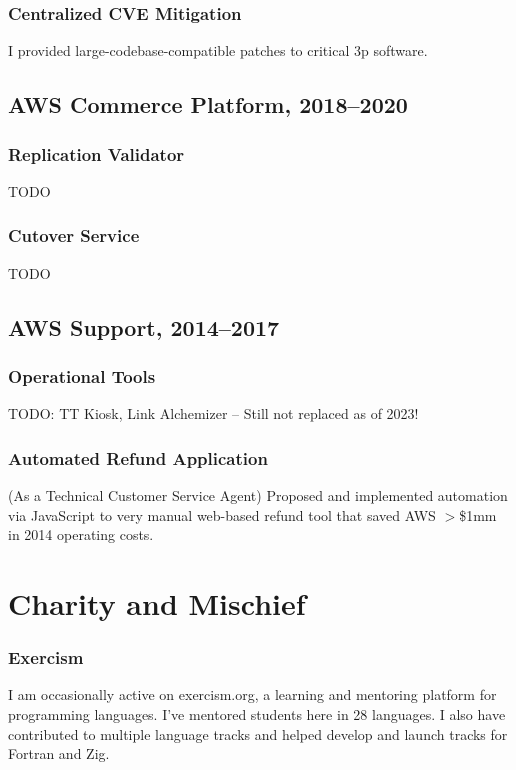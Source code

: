 \documentclass{article}
\begin{document}
\subsubsection{Centralized CVE Mitigation}
I provided large-codebase-compatible patches to critical 3p software.

\subsection{AWS Commerce Platform, 2018--2020}

\subsubsection{Replication Validator}
TODO

\subsubsection{Cutover Service}
TODO

\subsection{AWS Support, 2014--2017}

\subsubsection{Operational Tools}
TODO: TT Kiosk, Link Alchemizer -- Still not replaced as of 2023!

\subsubsection{Automated Refund Application}
(As a Technical Customer Service Agent) Proposed and implemented automation
via JavaScript to very manual web-based refund tool that saved AWS $>$\$1mm in
2014 operating costs.


\section{Charity and Mischief}

\subsubsection{Exercism}
I am occasionally active on exercism.org, a learning and mentoring platform for
programming languages. I've mentored students here in 28 languages. I also have
contributed to multiple language tracks and helped develop and launch tracks
for Fortran and Zig.
\end{document}

